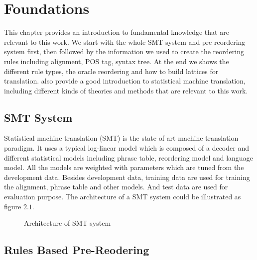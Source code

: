 
\chapter{Foundations}
\label{ch:Foundations}

This chapter provides an introduction to fundamental knowledge that are relevant to this work. We start with the whole SMT system and pre-reordering system first, then followed by the information we used to create the reordering rules including alignment, POS tag, syntax tree. At the end we shows the different rule types, the oracle reordering and how to build lattices for translation. \cite{book} also provide a good introduction to statistical machine translation, including different kinds of theories and methods that are relevant to this work.

\section{SMT System}
\label{ch:Foundations:sec:SMTSystem}


Statistical machine translation (SMT) is the state of art machine translation paradigm. It uses a typical log-linear model which is composed of a decoder and different statistical models including phrase table, reordering model and language model. All the models are weighted with parameters which are tuned from the development data. Besides development data, training data are used for training the alignment, phrase table and other models. And test data are used for evaluation purpose. The architecture of a SMT system could be illustrated as figure $2.1$.

\begin{figure}[H]
\centering

\caption{Architecture of SMT system}
\end{figure}

\section{Rules Based Pre-Reodering}
\label{ch:Foundations:sec:PreReorderingSystem}

